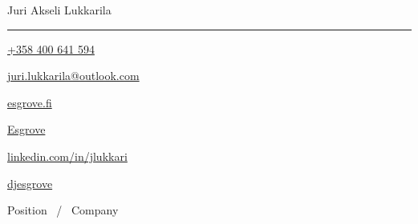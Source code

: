 \documentclass[11pt,a4paper,oneside]{article}
\newcommand*{\logopic}[1]{
        \raisebox{-0.34\baselineskip}{ %
                \texttt{[image: \#1]}}
}
\begin{document}
\begin{minipage}{\textwidth}
        \raggedright
        \centering
        {\Huge \namefont \color{headcolor}{Cover} \color{textcolor}{Letter}} \hfill 
        {\huge \namefont Juri Akseli Lukkarila}
        \vspace{0.8mm}
        \rule[0.8mm]{\textwidth}{2pt}
        \fontsize{9pt}{9pt}\selectfont
        \hspace*{0.5mm}
        \logopic{call.pdf}      \thinspace \href{tel:+358400641594}{+358 400 641 594} \hfill
        \logopic{mail.pdf}      \thinspace \href{mailto:juri.lukkarila@outlook.com}{juri.lukkarila@outlook.com} \hfill
        \logopic{web.pdf}       \thinspace \href{http://www.esgrove.fi}{esgrove.fi} \hfill
        \logopic{github.pdf}    \thinspace \href{https://github.com/Esgrove}{Esgrove} \hfill
        \logopic{linkedin.pdf}  \thinspace \href{https://www.linkedin.com/in/jlukkari/}{linkedin.com/in/jlukkari} \hfill
        \logopic{twitter.pdf}   \thinspace \href{https://twitter.com/djesgrove}{djesgrove}
        \hspace*{0.5mm}
\end{minipage}

\vspace{0.7cm}

\begin{center}
{\titledatefont \LARGE Position \ / \  Company} \\
\end{center}

\Blindtext
\end{document}
